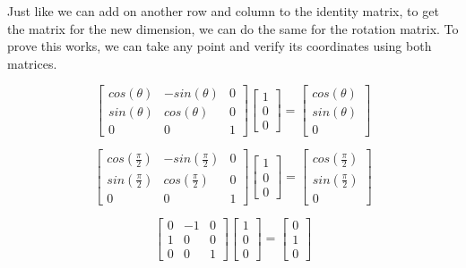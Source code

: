 \documentclass[14pt]{article}
\begin{document}
Just like we can add on another row and column to the identity matrix, to get the matrix for the new dimension, we can do the same for the rotation matrix. To prove this works, we can take any point and verify its coordinates using both matrices.

\vspace*{1em}

\begin{equation}
	\begin{bmatrix}
	cos(\theta) & -sin(\theta) & 0 \\
	sin(\theta) & cos(\theta) & 0 \\ 
	0 & 0 & 1
	\end{bmatrix}
	\begin{bmatrix}
	1 \\
	0 \\ 
	0
	\end{bmatrix}	
	=
	\begin{bmatrix}
	cos(\theta) \\
	sin(\theta) \\ 
	0
	\end{bmatrix}
\end{equation}

\vspace*{1em}

\begin{equation}
	\begin{bmatrix}
	cos(\frac{\pi}{2}) & -sin(\frac{\pi}{2}) & 0 \\
	sin(\frac{\pi}{2}) & cos(\frac{\pi}{2}) & 0 \\ 
	0 & 0 & 1
	\end{bmatrix}
	\begin{bmatrix}
	1 \\
	0 \\ 
	0
	\end{bmatrix}	
	=
	\begin{bmatrix}
	cos(\frac{\pi}{2}) \\
	sin(\frac{\pi}{2}) \\ 
	0
	\end{bmatrix}
\end{equation}

\vspace*{1em}

\begin{equation}
	\begin{bmatrix}
	0 & -1 & 0 \\
	1 & 0 & 0 \\ 
	0 & 0 & 1
	\end{bmatrix}
	\begin{bmatrix}
	1 \\
	0 \\ 
	0
	\end{bmatrix}	
	=
	\begin{bmatrix}
	0 \\
	1 \\ 
	0
	\end{bmatrix}
\end{equation}
\end{document}
